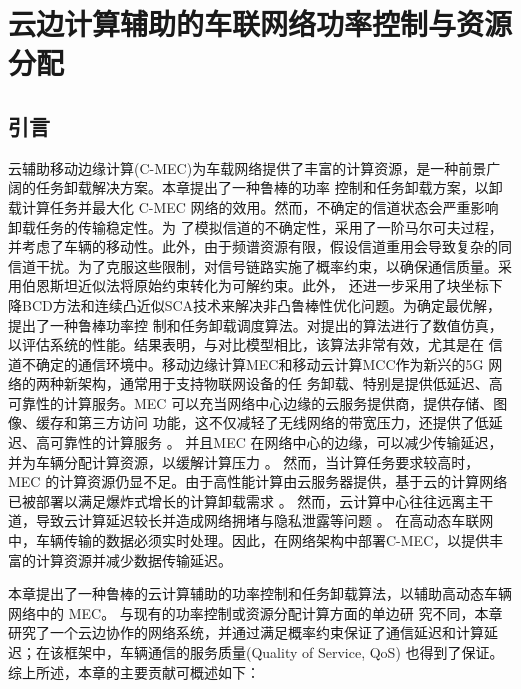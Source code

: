 \chapter{云边计算辅助的车联网络功率控制与资源分配} \label{chap:table 第三章}  %

\section{引言}\label{section3-1}
云辅助移动边缘计算(C-MEC)为车载网络提供了丰富的计算资源，是一种前景广阔的任务卸载解决方案。本章提出了一种鲁棒的功率
控制和任务卸载方案，以卸载计算任务并最大化 C-MEC 网络的效用。然而，不确定的信道状态会严重影响卸载任务的传输稳定性。为
了模拟信道的不确定性，采用了一阶马尔可夫过程，并考虑了车辆的移动性。此外，由于频谱资源有限，假设信道重用会导致复杂的同
信道干扰。为了克服这些限制，对信号链路实施了概率约束，以确保通信质量。采用伯恩斯坦近似法将原始约束转化为可解约束。此外，
还进一步采用了块坐标下降BCD方法和连续凸近似SCA技术来解决非凸鲁棒性优化问题。为确定最优解，提出了一种鲁棒功率控
制和任务卸载调度算法。对提出的算法进行了数值仿真，以评估系统的性能。结果表明，与对比模型相比，该算法非常有效，尤其是在
信道不确定的通信环境中。移动边缘计算MEC和移动云计算MCC作为新兴的5G 网络的两种新架构，通常用于支持物联网设备的任
务卸载、特别是提供低延迟、高可靠性的计算服务。MEC 可以充当网络中心边缘的云服务提供商，提供存储、图像、缓存和第三方访问
功能，这不仅减轻了无线网络的带宽压力，还提供了低延迟、高可靠性的计算服务 \supercite{基于车辆边缘计算的任务卸载策略研究}。
并且MEC 在网络中心的边缘，可以减少传输延迟，并为车辆分配计算资源，以缓解计算压力 \supercite{CCO}。 然而，当计算任务要求较高时，
MEC 的计算资源仍显不足。由于高性能计算由云服务器提供，基于云的计算网络已被部署以满足爆炸式增长的计算卸载需求 \supercite{SurveyMEC2017,SurveyMEC2018,DistributedTask2024}。  %
然而，云计算中心往往远离主干道，导致云计算延迟较长并造成网络拥堵与隐私泄露等问题 \supercite{Qian2023, 曹宇慧车载边缘计算环境下任务协同卸载方法研究,云计算隐私10418975}。
在高动态车联网中，车辆传输的数据必须实时处理。因此，在网络架构中部署C-MEC，以提供丰富的计算资源并减少数据传输延迟。

本章提出了一种鲁棒的云计算辅助的功率控制和任务卸载算法，以辅助高动态车辆网络中的 MEC。 与现有的功率控制或资源分配计算方面的单边研
究不同，本章研究了一个云边协作的网络系统，并通过满足概率约束保证了通信延迟和计算延迟；在该框架中，车辆通信的服务质量(Quality of Service, QoS)
也得到了保证。 综上所述，本章的主要贡献可概述如下：

